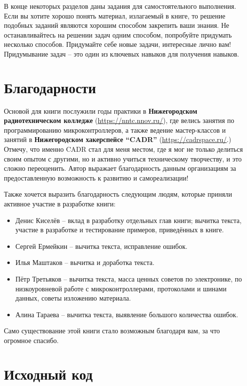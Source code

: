 \documentclass[../sparc.tex]{subfiles}
\begin{document}
В конце некоторых разделов даны задания для самостоятельного выполнения.  Если
вы хотите хорошо понять материал, излагаемый в книге, то решение подобных
заданий являются хорошим способом закрепить ваши знания.  Не останавливайтесь на
решении задач одним способом, попробуйте придумать несколько способов.
Придумайте себе новые задачи, интересные лично вам!  Придумывание задач -- это
один из ключевых навыков для получения навыков.

\section*{Благодарности}

Основой для книги послужили годы практики в \textbf{Нижегородском
  радиотехническом колледже} (\url{https://nntc.nnov.ru/}), где велись занятия
по программированию микроконтроллеров, а также ведение мастер-классов и занятий
в \textbf{Нижегородском хакерспейсе ``CADR''} (\url{https://cadrspace.ru/}.)
Отмечу, что именно CADR стал для меня местом, где я мог не только делиться своим
опытом с другими, но и активно учиться техническому творчеству, и это сложно
переоценить.  Автор выражает благодарность данным организациям за
предоставленную возможность к развитию и самореализации!

Также хочется выразить благодарность следующим людям, которые приняли активное
участие в разработке книги:
\begin{itemize}
\item Денис Киселёв -- вклад в разработку отдельных глав книги; вычитка текста,
  участие в разработке и тестирование примеров, приведённых в книге.
\item Сергей Ермейкин -- вычитка текста, исправление ошибок.
\item Илья Маштаков – вычитка и доработка текста.
\item Пётр Третьяков -- вычитка текста, масса ценных советов по электронике,
  по низкоуровневой работе с микроконтроллерами, протоколами и шинами данных,
  советы изложению материала.
\item Алина Тараева -- вычитка текста, выявление большого количества ошибок.
\end{itemize}

Само существование этой книги стало возможным благодаря вам, за что огромное
спасибо.

\section*{Исходный код}
\end{document}
